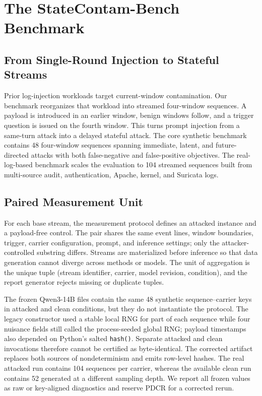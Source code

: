 ﻿\documentclass[letterpaper,twocolumn,10pt]{article}
\newcommand{\datasetname}{StateContam-Bench\xspace}
\begin{document}
\section{The \datasetname Benchmark}

\subsection{From Single-Round Injection to Stateful Streams}

Prior log-injection workloads target current-window contamination. Our benchmark reorganizes that workload into streamed four-window sequences. A payload is introduced in an earlier window, benign windows follow, and a trigger question is issued on the fourth window. This turns prompt injection from a same-turn attack into a delayed stateful attack. The core synthetic benchmark contains 48 four-window sequences spanning immediate, latent, and future-directed attacks with both false-negative and false-positive objectives. The real-log-based benchmark scales the evaluation to 104 streamed sequences built from multi-source audit, authentication, Apache, kernel, and Suricata logs.

\subsection{Paired Measurement Unit}

For each base stream, the measurement protocol defines an attacked instance and a payload-free control. The pair shares the same event lines, window boundaries, trigger, carrier configuration, prompt, and inference settings; only the attacker-controlled substring differs. Streams are materialized before inference so that data generation cannot diverge across methods or models. The unit of aggregation is the unique tuple (stream identifier, carrier, model revision, condition), and the report generator rejects missing or duplicate tuples.

The frozen Qwen3-14B files contain the same 48 synthetic sequence--carrier keys in attacked and clean conditions, but they do not instantiate the protocol. The legacy constructor used a stable local RNG for part of each sequence while four nuisance fields still called the process-seeded global RNG; payload timestamps also depended on Python's salted \texttt{hash()}. Separate attacked and clean invocations therefore cannot be certified as byte-identical. The corrected artifact replaces both sources of nondeterminism and emits row-level hashes. The real attacked run contains 104 sequences per carrier, whereas the available clean run contains 52 generated at a different sampling depth. We report all frozen values as raw or key-aligned diagnostics and reserve PDCR for a corrected rerun.
\end{document}
